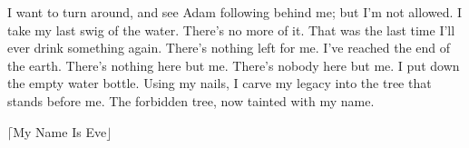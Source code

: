 \documentclass[a4paper, 12pt]{book}
\newcommand\tab[1][1cm]{\hspace*{#1}}
\newcommand\jquotes[1]{$\lceil$#1$\rfloor$}
\begin{document}
\newline
\tab
\newline
I want to turn around, and see Adam following behind me; but I’m not allowed. I take my last swig of the water. There’s no more of it. That was the last time I’ll ever drink something again. There’s nothing left for me. I’ve reached the end of the earth. There’s nothing here but me. There’s nobody here but me. I put down the empty water bottle. Using my nails, I carve my legacy into the tree that stands before me. The forbidden tree, now tainted with my name. 
\newline
\begin{center}
\jquotes{My Name Is Eve}
\end{center}
\end{document}
